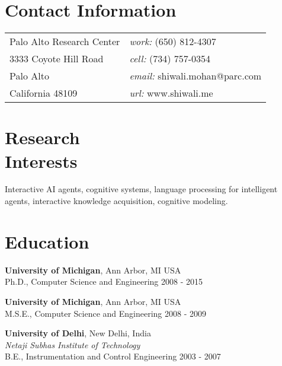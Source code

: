 \documentclass[margin,line,11pt]{res}
\begin{document}

\thispagestyle{empty}
\begin{resume}
  \section{\sc Contact Information}
  \vspace{.05in}
  \begin{tabular}{@{}p{3in}p{4in}}
    Palo Alto Research Center             & {\it work:}  (650) 812-4307 \\            
    3333 Coyote Hill Road                  & {\it cell:}    (734) 757-0354 \\         
    Palo Alto                            & {\it email:}  shiwali.mohan@parc.com\\       
    California 48109                          & {\it url:} www.shiwali.me \\     
  \end{tabular}


  \section{\sc Research \\Interests}
  Interactive AI agents, cognitive systems, language processing for
  intelligent agents, interactive knowledge acquisition, cognitive
  modeling.

  \section{\sc Education}
          {\bf University of Michigan}, Ann Arbor, MI USA\\
          Ph.D., Computer Science and Engineering \hfill 2008 - 2015 

          {\bf University of Michigan}, Ann Arbor, MI USA\\
          M.S.E., Computer Science and Engineering \hfill 2008 - 2009

          {\bf University of Delhi}, New Delhi, India\\
          {\em Netaji Subhas Institute of Technology}\\
          B.E.,  Instrumentation and Control Engineering \hfill 2003 - 2007


\end{resume}
\end{document}
